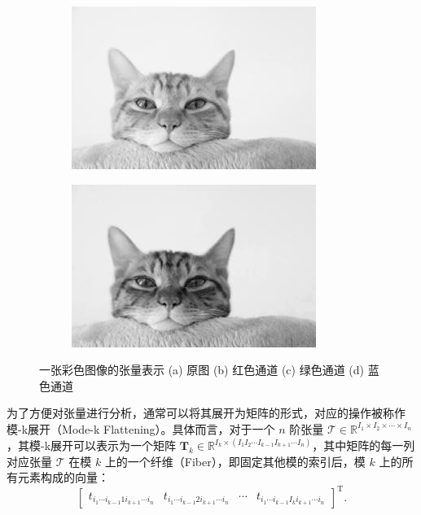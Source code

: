 \begin{figure}[htb!]
    \begin{subfigure}{.23\textwidth}
        \centering
        \includegraphics[width=.9\textwidth]{./img/matrix/cat_g.jpg}
        \caption{}
        \label{fig_img_tensor_3}
    \end{subfigure}
    \begin{subfigure}{.23\textwidth}
        \centering
        \includegraphics[width=.9\textwidth]{./img/matrix/cat_b.jpg}
        \caption{}
        \label{fig_img_tensor_4}
    \end{subfigure}
    \caption{一张彩色图像的张量表示 (a) 原图 (b) 红色通道 (c) 绿色通道 (d) 蓝色通道}
    \label{fig_img_tensor}
\end{figure}

为了方便对张量进行分析，通常可以将其展开为矩阵的形式，对应的操作被称作模-k展开（Mode-k Flattening）。具体而言，对于一个 $n$ 阶张量 $\mathcal{T} \in \mathbb{R}^{I_1 \times I_2 \times \cdots \times I_n}$，其模-k展开可以表示为一个矩阵 $\mathbf{T}_k \in \mathbb{R}^{I_k \times (I_1 I_2 \cdots I_{k-1} I_{k+1} \cdots I_n)}$，其中矩阵的每一列对应张量 $\mathcal{T}$ 在模 $k$ 上的一个纤维（Fiber），即固定其他模的索引后，模 $k$ 上的所有元素构成的向量：
\[
    \begin{bmatrix} t_{i_1 \cdots i_{k-1} 1 i_{k+1}\cdots i_n} &  t_{i_1 \cdots i_{k-1} 2 i_{k+1}\cdots i_n} & \cdots & t_{i_1 \cdots i_{k-1} I_k i_{k+1}\cdots i_n} \end{bmatrix}^{\mathrm{T}}.
\]

